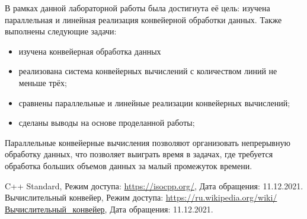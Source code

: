 \documentclass[12pt]{report}
\begin{document}
В рамках данной лабораторной работы была достигнута её цель: изучена параллельная и линейная реализация конвейерной обработки данных. Также выполнены следующие задачи:

\begin{itemize}
	\item изучена конвейерная обработка данных
	\item реализована система конвейерных вычислений с количеством линий не меньше трёх;
	\item сравнены параллельные и линейные реализации конвейерных вычислений;
	\item сделаны выводы на основе проделанной работы;
\end{itemize}

Параллельные конвейерные вычисления позволяют организовать непрерывную обработку данных, что позволяет выиграть время в задачах, где требуется обработка больших объемов данных за малый промежуток времени.



\newpage
{}
\begin{thebibliography}{}
C++ Standard, Режим доступа: \url{https://isocpp.org/}, Дата обращения: 11.12.2021.
Вычислительный конвейер, Режим доступа: \url{https://ru.wikipedia.org/wiki/Вычислительный\_конвейер}, Дата обращения: 11.12.2021.
\end{thebibliography}
\end{document}
